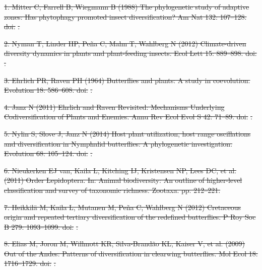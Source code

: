 \documentclass[10pt]{article}
\providecommand{\DIFdeltex}[1]{{\protect\color{red}\sout{#1}}}                      %
\providecommand{\DIFdel}[1]{\texorpdfstring{\DIFdeltex{#1}}{}} %
\begin{document}
\DIFdel{1. Mitter C, Farrell B, Wiegmann B (1988) The phylogenetic study of
adaptive zones: Has phytophagy promoted insect diversification? Am Nat
132: 107--128.
doi:}%
\DIFdel{.
}%

\DIFdel{2. Nyman T, Linder HP, Peña C, Malm T, Wahlberg N (2012) Climate-driven
diversity dynamics in plants and plant-feeding insects. Ecol Lett 15:
889--898.
doi:}%
\DIFdel{.
}%

\DIFdel{3. Ehrlich PR, Raven PH (1964) Butterflies and plants: A study in
coevolution. Evolution 18: 586--608.
doi:}%
\DIFdel{.
}%

\DIFdel{4. Janz N (2011) Ehrlich and Raven Revisited: Mechanisms Underlying
Codiversification of Plants and Enemies. Annu Rev Ecol Evol S 42:
71--89.
doi:}%
\DIFdel{.
}%

\DIFdel{5. Nylin S, Slove J, Janz N (2014) Host plant utilization, host range
oscillations and diversification in Nymphalid butterflies: A
phylogenetic investigation. Evolution 68: 105--124.
doi:}%
\DIFdel{.
}%

\DIFdel{6. Nieukerken EJ van, Kaila L, Kitching IJ, Kristensen NP, Lees DC, et
al. (2011) Order Lepidoptera. In: Animal biodiversity: An outline of
higher-level classification and survey of taxonomic richness. Zootaxa.
pp. 212--221.
}%

\DIFdel{7. Heikkilä M, Kaila L, Mutanen M, Peña C, Wahlberg N (2012) Cretaceous
origin and repeated tertiary diversification of the redefined
butterflies. P Roy Soc B 279: 1093--1099.
doi:}%
\DIFdel{.
}%

\DIFdel{8. Elias M, Joron M, Willmott KR, Silva-Brandão KL, Kaiser V, et al.
(2009) Out of the Andes: Patterns of diversification in clearwing
butterflies. Mol Ecol 18: 1716--1729.
doi:}%
\DIFdel{.
}%
\end{document}
